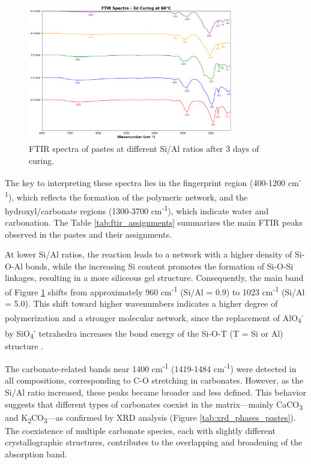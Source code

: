 \begin{figure}[H]
    \centering
    \includegraphics[width=0.8\textwidth]{Cap4/images/ftir_comparison_3d_curing.png}
    \caption{FTIR spectra of pastes at different Si/Al ratios after 3 days of curing.}
    \label{fig:ftir_pastes}
\end{figure}

The key to interpreting these spectra lies in the fingerprint region (400-1200 cm\textsuperscript{-1}), which reflects the formation of the polymeric network, and the hydroxyl/carbonate regions (1300-3700 cm\textsuperscript{-1}), which indicate water and carbonation.
The Table \ref{tab:ftir_assignments} summarizes the main FTIR peaks observed in the pastes and their assignments.

At lower Si/Al ratios, the reaction leads to a network with a higher density of Si-O-Al bonds, while the increasing Si content promotes the formation of Si-O-Si linkages, resulting in a more siliceous gel structure.
Consequently, the main band of Figure \ref{fig:ftir_pastes} shifts from approximately 960 cm\textsuperscript{-1} (Si/Al = 0.9) to 1023 cm\textsuperscript{-1} (Si/Al = 5.0).
This shift toward higher wavenumbers indicates a higher degree of polymerization and a stronger molecular network, since the replacement of AlO\textsubscript{4}\textsuperscript{-} by SiO\textsubscript{4}\textsuperscript{-} tetrahedra increases the bond energy of the Si-O-T (T = Si or Al) structure \cite{pachecotorgal2014handbook, ma2022calcium, provis2009geopolymers}.

The carbonate-related bands near 1400 cm\textsuperscript{-1} (1419-1484 cm\textsuperscript{-1}) were detected in all compositions, corresponding to C-O stretching in carbonates. However, as the Si/Al ratio increased, these peaks became broader and less defined. This behavior suggests that different types of carbonates coexist in the matrix—mainly CaCO\textsubscript{3} and K\textsubscript{2}CO\textsubscript{3}—as confirmed by XRD analysis (Figure \ref{tab:xrd_phases_pastes}). The coexistence of multiple carbonate species, each with slightly different crystallographic structures, contributes to the overlapping and broadening of the absorption band.

